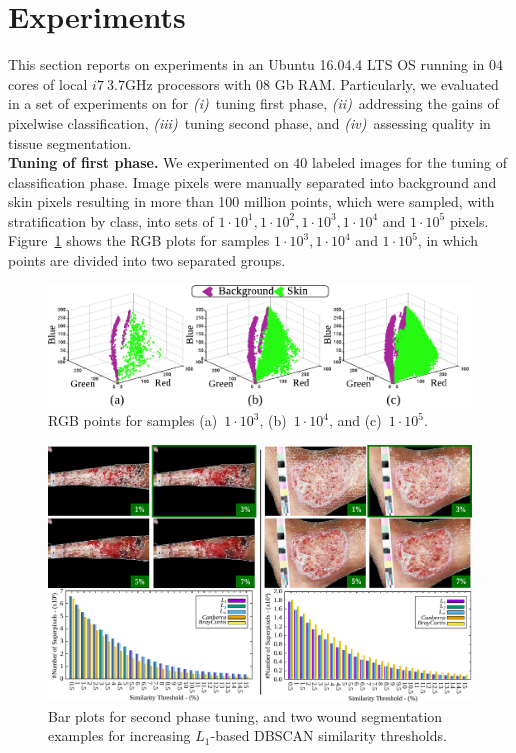 \section{Experiments}

This section reports on \system experiments in an Ubuntu 16.04.4 LTS OS running in $04$ cores of local $i7~3.7$GHz processors with 08 Gb RAM.
Particularly, we evaluated \system in a set of experiments on \dataset for 
\textit{(i)}~tuning \system first phase,
\textit{(ii)}~addressing the gains of pixelwise classification,
\textit{(iii)}~tuning \system second phase, and
\textit{(iv)}~assessing \system quality in tissue segmentation.\\

\noindent
\textbf{Tuning of \system first phase.}
We experimented on $40$ labeled \dataset images for the tuning of \system classification phase.
Image pixels were manually separated into background and skin pixels resulting in more than 100 million points, which were sampled, with stratification by class, into sets of $1 \cdot 10^1, 1 \cdot 10^2, 1 \cdot 10^3, 1 \cdot 10^4$ and $1 \cdot 10^5$ pixels.
Figure~\ref{fig:sample} shows the RGB plots for samples $1 \cdot 10^3, 1 \cdot 10^4$ and $1 \cdot 10^5$, in which points are divided into two separated groups.

\begin{figure}[!htb]
\centering
\includegraphics[scale=1.02]{figs/plots.pdf}
\caption{RGB points for samples
(a)~$1 \cdot 10^3$,
(b)~$1 \cdot 10^4$, and
(c)~$1 \cdot 10^5$.}
\label{fig:sample}
\end{figure}

\begin{figure}[!htb]
\centering
\includegraphics[scale=.84]{figs/res2.pdf}
\vspace{-6px}
\caption{Bar plots for \system second phase tuning, and two wound segmentation examples for increasing $L_1$-based DBSCAN similarity thresholds.}
\label{fig:expto_dbscan}
\end{figure}


